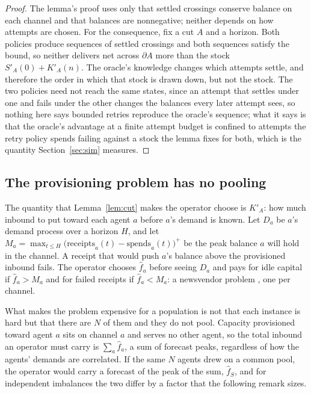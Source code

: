 \documentclass[11pt]{article}
\theoremstyle{plain}
\theoremstyle{definition}
\theoremstyle{remark}
\begin{document}
\begin{proof}
The lemma's proof uses only that settled crossings conserve balance on each channel and that balances are nonnegative; neither depends on how attempts are chosen. For the consequence, fix a cut $A$ and a horizon. Both policies produce sequences of settled crossings and both sequences satisfy the bound, so neither delivers net across $\partial A$ more than the stock $S'_A(0)+K'_A(n)$. The oracle's knowledge changes which attempts settle, and therefore the order in which that stock is drawn down, but not the stock. The two policies need not reach the same states, since an attempt that settles under one and fails under the other changes the balances every later attempt sees, so nothing here says bounded retries reproduce the oracle's sequence; what it says is that the oracle's advantage at a finite attempt budget is confined to attempts the retry policy spends failing against a stock the lemma fixes for both, which is the quantity Section~\ref{sec:sim} measures.
\end{proof}



\subsection{The provisioning problem has no pooling}

The quantity that Lemma~\ref{lem:cut} makes the operator choose is $K'_A$: how much inbound to put toward each agent $a$ before $a$'s demand is known. Let $D_a$ be $a$'s demand process over a horizon $H$, and let $M_a=\max_{t\le H}\big(\text{receipts}_a(t)-\text{spends}_a(t)\big)^+$ be the peak balance $a$ will hold in the channel. A receipt that would push $a$'s balance above the provisioned inbound fails. The operator chooses $\hat f_a$ before seeing $D_a$ and pays for idle capital if $\hat f_a>M_a$ and for failed receipts if $\hat f_a<M_a$: a newsvendor problem \citep{arrow1951inventory}, one per channel.

What makes the problem expensive for a population is not that each instance is hard but that there are $N$ of them and they do not pool. Capacity provisioned toward agent $a$ sits on channel $a$ and serves no other agent, so the total inbound an operator must carry is $\sum_a\hat f_a$, a sum of forecast peaks, regardless of how the agents' demands are correlated. If the same $N$ agents drew on a common pool, the operator would carry a forecast of the peak of the sum, $\hat f_S$, and for independent imbalances the two differ by a factor that the following remark sizes.
\end{document}
